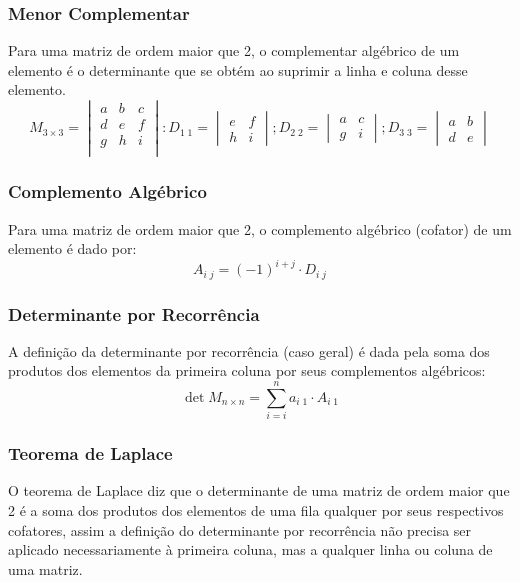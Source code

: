     \subsubsection{Menor Complementar}
        Para uma matriz de ordem maior que 2, o complementar algébrico de um elemento é o determinante que se obtém ao suprimir a linha e coluna desse elemento. \eg
        \[ M_{3 \times 3} = \begin{vmatrix} a & b & c \\ d & e & f \\ g & h & i \\ \end{vmatrix} : D_{1 \; 1} =  \begin{vmatrix} e & f\\ h & i\end{vmatrix}; D_{2 \; 2} =  \begin{vmatrix} a & c\\ g & i \end{vmatrix}; D_{3 \; 3} =  \begin{vmatrix} a & b \\ d & e \end{vmatrix} \]
        \subsubsection{Complemento Algébrico}
        Para uma matriz de ordem maior que 2, o complemento algébrico (cofator) de um elemento é dado por:
        \[ A_{i \; j} = (-1)^{i + j} \cdot D_{i \; j} \]
    \subsubsection{Determinante por Recorrência}
        A definição da determinante por recorrência (caso geral) é dada pela soma dos produtos dos elementos da primeira coluna por seus complementos algébricos:
        \[ \det{M_{n \times n}} = \displaystyle\sum_{i=i}^{n} {a_{i \; 1} \cdot A_{i \; 1} } \]
    \subsubsection{Teorema de Laplace}
        O teorema de Laplace diz que o determinante de uma matriz de ordem maior que 2 é a soma dos produtos dos elementos de uma fila qualquer por seus respectivos cofatores, assim a definição do determinante por recorrência não precisa ser aplicado necessariamente à primeira coluna, mas a qualquer linha ou coluna de uma matriz.
